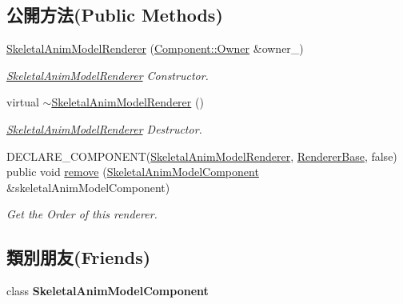 \subsection*{公開方法(Public Methods)}
\begin{DoxyCompactItemize}
\item 
\hyperlink{class_magnum_1_1_skeletal_anim_model_renderer_aa19360f6fe46f14d0f8d7c4a760b619d}{Skeletal\+Anim\+Model\+Renderer} (\hyperlink{class_magnum_1_1_component_1_1_owner}{Component\+::\+Owner} \&owner\+\_\+)
\begin{DoxyCompactList}\small\item\em \hyperlink{class_magnum_1_1_skeletal_anim_model_renderer}{Skeletal\+Anim\+Model\+Renderer} Constructor. \end{DoxyCompactList}\item 
virtual \hyperlink{class_magnum_1_1_skeletal_anim_model_renderer_a2c6087f0d38273702c1e7f22359a9a52}{$\sim$\+Skeletal\+Anim\+Model\+Renderer} ()
\begin{DoxyCompactList}\small\item\em \hyperlink{class_magnum_1_1_skeletal_anim_model_renderer}{Skeletal\+Anim\+Model\+Renderer} Destructor. \end{DoxyCompactList}\item 
D\+E\+C\+L\+A\+R\+E\+\_\+\+C\+O\+M\+P\+O\+N\+E\+NT(\hyperlink{class_magnum_1_1_skeletal_anim_model_renderer}{Skeletal\+Anim\+Model\+Renderer}, \hyperlink{class_magnum_1_1_renderer_base}{Renderer\+Base}, false) public void \hyperlink{class_magnum_1_1_skeletal_anim_model_renderer_a138ac08d14815bdc63a73b2d0722f52f}{remove} (\hyperlink{class_magnum_1_1_skeletal_anim_model_component}{Skeletal\+Anim\+Model\+Component} \&skeletal\+Anim\+Model\+Component)
\begin{DoxyCompactList}\small\item\em Get the Order of this renderer. \end{DoxyCompactList}\end{DoxyCompactItemize}
\subsection*{類別朋友(Friends)}
\begin{DoxyCompactItemize}
\item 
class {\bfseries Skeletal\+Anim\+Model\+Component}\hypertarget{class_magnum_1_1_skeletal_anim_model_renderer_a669dafd644dc91412347278e192e8099}{}\label{class_magnum_1_1_skeletal_anim_model_renderer_a669dafd644dc91412347278e192e8099}

\end{DoxyCompactItemize}
